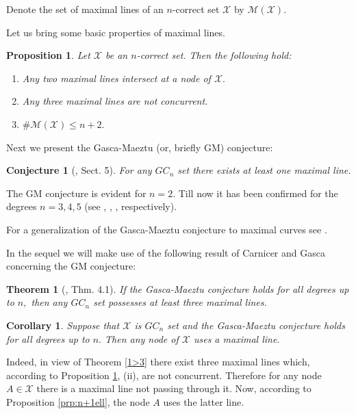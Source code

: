 \documentclass[a4paper,12pt]{article}
\newtheorem{theorem}[lemma]{Theorem}
\newtheorem{proposition}[lemma]{Proposition}
\newtheorem{conjecture}[lemma]{Conjecture}
\newtheorem{corollary}[lemma]{Corollary}
\theoremstyle{definition}
\numberwithin{equation}{section}
\numberwithin{figure}{section}
\newcommand{\Mset}{\mathcal{M}}
\newcommand{\Xset}{\mathcal{X}}
\begin{document}
Denote the set of maximal lines of an $n$-correct set $\Xset$ by $\Mset(\Xset).$



Let us bring some basic properties of maximal lines.

\begin{proposition} \label{hatk} Let $\Xset$ be an $n$-correct set. Then the following hold:
\begin{enumerate}
\item
Any two maximal lines intersect at a node of $\Xset.$
\item
Any three maximal lines are not concurrent.
\item
$\#\Mset(\Xset)\le n+2.$
\end{enumerate}
\end{proposition}

Next we present the Gasca-Maeztu (or, briefly GM) conjecture:

\begin{conjecture}[\cite{GM82}, Sect. 5]\label{conj:GM}
For any $GC_n$ set there exists at least
one maximal line.
\end{conjecture}

\noindent The GM conjecture is evident for $n=2.$ Till now it has been confirmed for the degrees
$n=3,4,5$ (see \cite{GM82}, \cite{B90}, \cite{HJZ14}, respectively).

For a generalization of the Gasca-Maeztu conjecture to maximal curves see \cite{HR}.

In the sequel we will make use of the following result of Carnicer and
Gasca concerning the GM conjecture:
\begin{theorem}[\cite{CG03}, Thm. 4.1] \label{CGth}\label{1>3} If the Gasca-Maeztu conjecture  holds for all degrees up to $n,$ then any $GC_n$ set possesses at least three maximal lines. 
\end{theorem}
\begin{corollary} \label{CGcor} Suppose that $\Xset$ is $GC_n$ set and the Gasca-Maeztu conjecture  holds for all degrees up to $n.$ Then any node of $\Xset$ uses a maximal line.
\end{corollary}
Indeed, in view of Theorem \ref{1>3} there exist three maximal lines which, according to Proposition \ref{hatk}, (ii), are not concurrent. Therefore for any node  $A\in\Xset$  there is a maximal line not passing through it. Now, according to Proposition \ref{prp:n+1ell}, the node $A$ uses the latter line.
\end{document}
